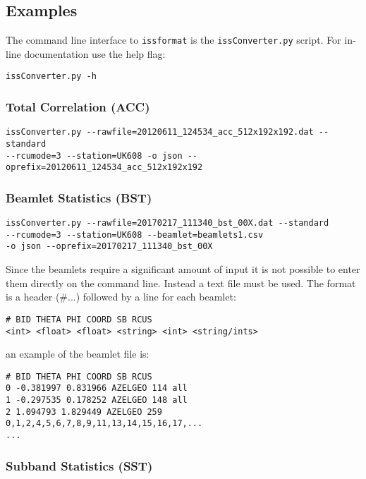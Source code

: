 \documentclass[10pt,a4paper]{article}
\begin{document}
\subsection{Examples}

The command line interface to \texttt{issformat} is the \texttt{issConverter.py}
script. For in-line documentation use the help flag:

\begin{verbatim}
issConverter.py -h
\end{verbatim}

\subsubsection{Total Correlation (ACC)}

\begin{verbatim}
issConverter.py --rawfile=20120611_124534_acc_512x192x192.dat --standard
--rcumode=3 --station=UK608 -o json --oprefix=20120611_124534_acc_512x192x192
\end{verbatim}

\subsubsection{Beamlet Statistics (BST)}

\begin{verbatim}
issConverter.py --rawfile=20170217_111340_bst_00X.dat --standard
--rcumode=3 --station=UK608 --beamlet=beamlets1.csv
-o json --oprefix=20170217_111340_bst_00X
\end{verbatim}

Since the beamlets require a significant amount of input it is not possible to
enter them directly on the command line. Instead a text file must be used. The
format is a header (\#...) followed by a line for each beamlet:

\begin{verbatim}
# BID THETA PHI COORD SB RCUS
<int> <float> <float> <string> <int> <string/ints>
\end{verbatim}

\noindent an example of the beamlet file is:

\begin{verbatim}
# BID THETA PHI COORD SB RCUS
0 -0.381997 0.831966 AZELGEO 114 all
1 -0.297535 0.178252 AZELGEO 148 all
2 1.094793 1.829449 AZELGEO 259 0,1,2,4,5,6,7,8,9,11,13,14,15,16,17,...
...
\end{verbatim}

\subsubsection{Subband Statistics (SST)}
\end{document}
